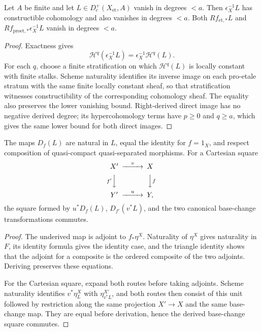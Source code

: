 \begin{lemma}
\label{lemma:weil-pbc-epsilon-direct-image-constructible-bounds}
\uses{}

Let $A$ be finite and let $L\in D_c^+(X_{\mathrm{et}},A)$ vanish in degrees
$<a$.  Then $\epsilon_X^{-1}L$ has constructible cohomology and also vanishes
in degrees $<a$.  Both $Rf_{\mathrm{et},*}L$ and
$Rf_{\mathrm{proet},*}\epsilon_X^{-1}L$ vanish in degrees $<a$.
\end{lemma}
\begin{proof}

Exactness gives
\[
 \mathcal H^q(\epsilon_X^{-1}L)
 =\epsilon_X^{-1}\mathcal H^q(L).
\]
For each $q$, choose a finite stratification on which $\mathcal H^q(L)$ is
locally constant with finite stalks.  Scheme naturality identifies its inverse
image on each pro-etale stratum with the same finite locally constant sheaf,
so that stratification witnesses constructibility of the corresponding
cohomology sheaf.  The equality also preserves the lower vanishing bound.
Right-derived direct image has no
negative derived degree; its hypercohomology terms have $p\geq0$ and
$q\geq a$, which gives the same lower bound for both direct images.
\end{proof}

\begin{lemma}
\label{lemma:weil-pbc-epsilon-direct-image-naturality}
The maps $D_f(L)$ are natural in $L$, equal the identity for $f=1_X$, and
respect composition of quasi-compact quasi-separated morphisms.  For a
Cartesian square
\[
\begin{CD}
X'@>{v}>>X\\
@V{f'}VV @VV{f}V\\
Y'@>{u}>>Y,
\end{CD}
\]
the square formed by $u^*D_f(L)$, $D_{f'}(v^*L)$, and the two canonical
base-change transformations commutes.
\end{lemma}
\begin{proof}

The underived map is adjoint to $f_*\eta^X$.  Naturality of $\eta^X$ gives
naturality in $F$, its identity formula gives the identity case, and the
triangle identity shows that the adjoint for a composite is the ordered
composite of the two adjoints.  Deriving preserves these equations.

For the Cartesian square, expand both routes before taking adjoints.  Scheme
naturality identifies $v^*\eta^X_L$ with $\eta^{X'}_{v^*L}$, and both routes
then consist of this unit followed by restriction along the same projection
$X'\to X$ and the same base-change map.  They are equal before derivation,
hence the derived base-change square commutes.
\end{proof}

